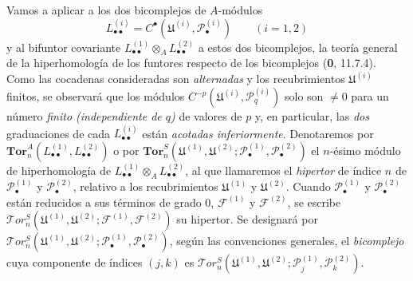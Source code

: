 \begin{env}[6.6.2]
Vamos a aplicar a los dos bicomplejos de $A$-módulos
\[
  L_{\bullet\bullet}^{(i)}
  =C^\bullet(\mathfrak U^{(i)},\mathscr P_\bullet^{(i)})
  \qquad(i=1,2)
\] y al bifuntor covariante $L_{\bullet\bullet}^{(1)}\otimes_A L_{\bullet\bullet}^{(2)}$ a estos dos bicomplejos, la teoría general de la hiperhomología de los funtores respecto de los bicomplejos (\textbf{0}, 11.7.4). Como las cocadenas consideradas son \emph{alternadas} y los recubrimientos $\mathfrak U^{(i)}$ finitos, se observará que los módulos $C^{-p}(\mathfrak U^{(i)},\mathscr P_q^{(i)})$ solo son $\ne0$
para un número \emph{finito (independiente de $q$)} de valores de $p$ y, en
particular, las \emph{dos} graduaciones de cada $L_{\bullet\bullet}^{(i)}$ están
\emph{acotadas inferiormente}. Denotaremos por
$\mathbf{Tor}_n^A(L_{\bullet\bullet}^{(1)},L_{\bullet\bullet}^{(2)})$
o por
$\mathbf{Tor}_n^S
(\mathfrak U^{(1)},\mathfrak U^{(2)};
\mathscr P_\bullet^{(1)},\mathscr P_\bullet^{(2)})$
el $n$-ésimo módulo de hiperhomología de
$L_{\bullet\bullet}^{(1)}\otimes_A L_{\bullet\bullet}^{(2)}$, al que
llamaremos el \emph{hipertor} de índice $n$ de
$\mathscr P_\bullet^{(1)}$ y $\mathscr P_\bullet^{(2)}$, relativo a los
recubrimientos $\mathfrak U^{(1)}$ y $\mathfrak U^{(2)}$. Cuando
$\mathscr P_\bullet^{(1)}$ y $\mathscr P_\bullet^{(2)}$ están reducidos a sus
términos de grado 0, $\mathscr F^{(1)}$ y $\mathscr F^{(2)}$, se escribe
$\mathscr{T}\!or_n^S
(\mathfrak U^{(1)},\mathfrak U^{(2)};
\mathscr F^{(1)},\mathscr F^{(2)})$ su hipertor. Se designará por $\mathscr{T}\!or_n^S
(\mathfrak U^{(1)},\mathfrak U^{(2)};
\mathscr P_\bullet^{(1)},\mathscr P_\bullet^{(2)})$, según las convenciones generales, el \emph{bicomplejo} cuya componente de índices $(j,k)$ es
$\mathscr{T}\!or_n^S
(\mathfrak U^{(1)},\mathfrak U^{(2)};
\mathscr P_j^{(1)},\mathscr P_k^{(2)})$.


\end{env}
